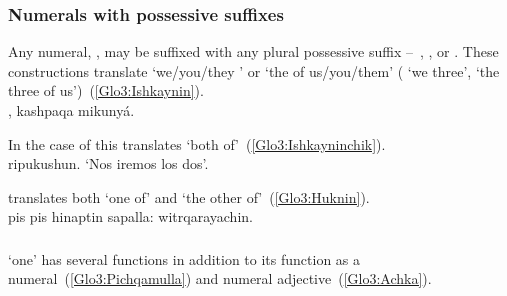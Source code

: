 \subsubsection{Numerals with possessive suffixes}\label{ssec:numallaff}
Any numeral, , may be suffixed with any plural possessive suffix --~, , or . These constructions translate ‘we/you/they ’ or ‘the  of us/you/them’ ( ‘we three’, ‘the three of us’)~(\ref{Glo3:Ishkaynin}).\\

%
{,  kashpaqa mikunyá.}%
{}%
{}{}%

\noindent
In the case of  this translates ‘both of’~(\ref{Glo3:Ishkayninchik}).\\

%
{ ripukushun.}%
{}%
{‘Nos iremos los dos’.}%
{}{}%

\noindent
{} translates both ‘one of’ and ‘the other of’~(\ref{Glo3:Huknin}).\\

%
{pis pis hinaptin sapalla: witrqarayachin.}%
{}%
{}{}%

\subsubsection{}\label{ssec:huk}
 ‘one’ has several functions in addition to its function as a numeral~(\ref{Glo3:Pichqamulla}) and numeral adjective~(\ref{Glo3:Achka}).\\


